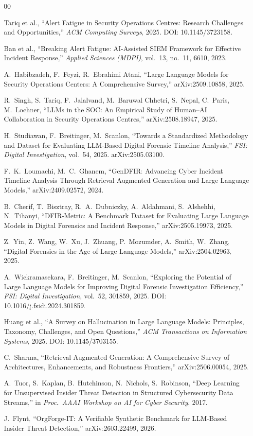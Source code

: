 \documentclass[conference]{IEEEtran}
\begin{document}
\begin{thebibliography}{00}

Tariq et al., ``Alert Fatigue in Security Operations Centres: Research Challenges and Opportunities,'' \textit{ACM Computing Surveys}, 2025. DOI: 10.1145/3723158.

Ban et al., ``Breaking Alert Fatigue: AI-Assisted SIEM Framework for Effective Incident Response,'' \textit{Applied Sciences (MDPI)}, vol.~13, no.~11, 6610, 2023.

A.~Habibzadeh, F.~Feyzi, R.~Ebrahimi Atani, ``Large Language Models for Security Operations Centers: A Comprehensive Survey,'' arXiv:2509.10858, 2025.

R.~Singh, S.~Tariq, F.~Jalalvand, M.~Baruwal Chhetri, S.~Nepal, C.~Paris, M.~Lochner, ``LLMs in the SOC: An Empirical Study of Human--AI Collaboration in Security Operations Centres,'' arXiv:2508.18947, 2025.

H.~Studiawan, F.~Breitinger, M.~Scanlon, ``Towards a Standardized Methodology and Dataset for Evaluating LLM-Based Digital Forensic Timeline Analysis,'' \textit{FSI: Digital Investigation}, vol.~54, 2025. arXiv:2505.03100.

F.~K.~Loumachi, M.~C.~Ghanem, ``GenDFIR: Advancing Cyber Incident Timeline Analysis Through Retrieval Augmented Generation and Large Language Models,'' arXiv:2409.02572, 2024.

B.~Cherif, T.~Bisztray, R.~A.~Dubniczky, A.~Aldahmani, S.~Alshehhi, N.~Tihanyi, ``DFIR-Metric: A Benchmark Dataset for Evaluating Large Language Models in Digital Forensics and Incident Response,'' arXiv:2505.19973, 2025.

Z.~Yin, Z.~Wang, W.~Xu, J.~Zhuang, P.~Mozumder, A.~Smith, W.~Zhang, ``Digital Forensics in the Age of Large Language Models,'' arXiv:2504.02963, 2025.

A.~Wickramasekara, F.~Breitinger, M.~Scanlon, ``Exploring the Potential of Large Language Models for Improving Digital Forensic Investigation Efficiency,'' \textit{FSI: Digital Investigation}, vol.~52, 301859, 2025. DOI: 10.1016/j.fsidi.2024.301859.

Huang et al., ``A Survey on Hallucination in Large Language Models: Principles, Taxonomy, Challenges, and Open Questions,'' \textit{ACM Transactions on Information Systems}, 2025. DOI: 10.1145/3703155.

C.~Sharma, ``Retrieval-Augmented Generation: A Comprehensive Survey of Architectures, Enhancements, and Robustness Frontiers,'' arXiv:2506.00054, 2025.

A.~Tuor, S.~Kaplan, B.~Hutchinson, N.~Nichols, S.~Robinson, ``Deep Learning for Unsupervised Insider Threat Detection in Structured Cybersecurity Data Streams,'' in \textit{Proc.\ AAAI Workshop on AI for Cyber Security}, 2017.

J.~Flynt, ``OrgForge-IT: A Verifiable Synthetic Benchmark for LLM-Based Insider Threat Detection,'' arXiv:2603.22499, 2026.

\end{thebibliography}
\end{document}

